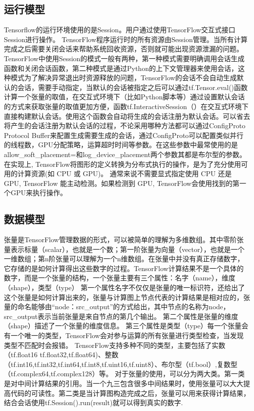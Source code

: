 		\subsection{运行模型}
		Tensorflow的运行环境使用的是Session。用户通过使用TensorFlow交互式接口Session进行操作。
		TensorFlow程序运行时的所有资源由Session管理。当所有计算完成之后需要关闭会话来帮助系统回收资源，否则就可能出现资源泄漏的问题。TensorFlow中使用Session的模式一般有两种，第一种模式需要明确调用会话生成函数和关闭会话函数，第二种模式是通过Python的上下文管理器来使用会话，这种模式为了解决异常退出时资源释放的问题，TensorFlow的会话不会自动生成默认的会话，需要手动指定，当默认的会话被指定之后可以通过tf.Tensor.eval()函数计算一个张量的取值，在交互式环境下（比如Python脚本等）通过设置默认会话的方式来获取张量的取值更加方便，函数tf.InteractiveSession（）在交互式环境下直接构建默认会话。使用这个函数会自动将生成的会话注册为默认会话。可以省去将产生的会话注册为默认会话的过程，不论采用哪种方法都可以通过ConfigProto Protocol Buffer来配置生成需要生成的会话，通过ConfigProto可以配置类似并行的线程数，GPU分配策略，运算超时时间等参数。在这些参数中最常使用的是allow\_soft\_placement=和log\_device\_placement两个参数其都是布尔型的参数。 
		在实现上, TensorFlow将图形的定义转换为分布式执行的操作，是为了充分使用可用的计算资源(如 CPU 或 GPU)。 通常来说不需要显式指定使用 CPU 还是 GPU, TensorFlow 能主动检测。如果检测到 GPU, TensorFlow会使用找到的第一个GPU来执行操作。
		
		\subsection{数据模型}
		张量是TensorFlow管理数据的形式，可以被简单的理解为多维数组。其中零阶张量表示标量（scalar），也就是一个数；第一阶张量为向量（vector），也就是一个一维数组；第n阶张量可以理解为一个n维数组。在张量中并没有真正存储数字，它存储的是如何计算得出这些数字的过程。TensorFlow计算结果不是一个具体的数字，而是一个张量的结构，一个张量主要有三个属性：名字（name），维度（shape），类型（type） 
		第一个属性名字不仅仅是张量的唯一标识符，还给出了这个张量是如何计算出来的，张量与计算图上节点代表的计算结果是相对应的，张量的命名能够由“node：src\_output”的方式给出，其中节点的名称为node，src\_output表示当前张量是来自节点的第几个输出。 
		第二个属性是张量的维度（shape）描述了一个张量的维度信息。 
		第三个属性是类型（type）每一个张量会有一个唯一的类型，TensorFlow会对参与运算的所有张量进行类型检查，当发现类型不匹配时会报错。 
		TensorFlow支持多种不同的类型，主要包括了实数（tf.float16 tf.float32,tf.float64)、整数（tf.int16,tf.int32,tf.int64,tf.int8,tf.uint16,tf.uint8）、布尔型（tf.bool）,复数型（tf.complex64,tf.complex128）等。 对于张量的使用，可以分为两大类。第一类是对中间计算结果的引用。当一个九三包含很多中间结果时，使用张量可以大大提高代码的可读性。第二类是当计算图构造完成之后，张量可以用来获得计算结果，结合会话使用tf.Session().run(result)就可以得到真实的数字.
